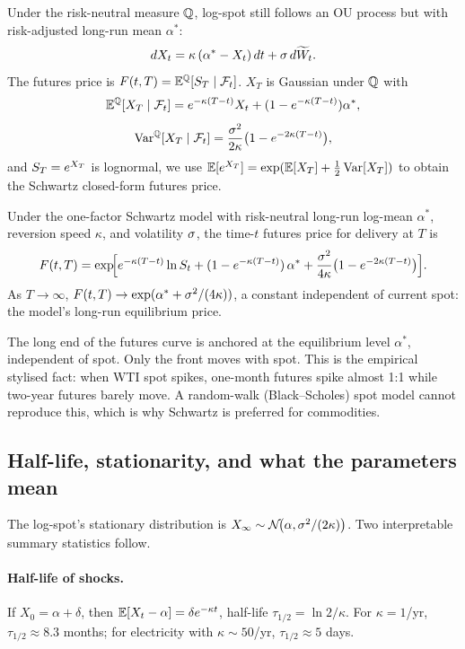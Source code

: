 Under the risk-neutral measure $\mathbb{Q}$, log-spot still follows an OU
process but with risk-adjusted long-run mean $\alpha^*$:
\[
  dX_t = \kappa\,(\alpha^* - X_t)\,dt + \sigma\,d\widetilde W_t.
\]
The futures price is $F(t,T) = \mathbb{E}^{\mathbb{Q}}[S_T \mid \mathcal F_t]$.
$X_T$ is Gaussian under $\mathbb{Q}$ with
\[
  \mathbb{E}^{\mathbb{Q}}[X_T \mid \mathcal F_t] = e^{-\kappa(T-t)} X_t
    + (1 - e^{-\kappa(T-t)})\alpha^*,
\]
\[
  \operatorname{Var}^{\mathbb{Q}}[X_T \mid \mathcal F_t]
    = \frac{\sigma^2}{2\kappa}\bigl(1 - e^{-2\kappa(T-t)}\bigr),
\]
and $S_T = e^{X_T}$ is lognormal, we use
$\mathbb{E}[e^{X_T}] = \exp(\mathbb{E}[X_T] + \tfrac12 \operatorname{Var}[X_T])$ to obtain the
Schwartz closed-form futures price.

\begin{keyfactbox}
Under the one-factor Schwartz model with risk-neutral long-run
log-mean $\alpha^*$, reversion speed $\kappa$, and volatility
$\sigma$, the time-$t$ futures price for delivery at $T$ is
\begin{equation}
  F(t,T) = \exp\!\Bigl[
    e^{-\kappa(T-t)} \ln S_t
    + (1 - e^{-\kappa(T-t)})\,\alpha^*
    + \frac{\sigma^2}{4\kappa}\bigl(1 - e^{-2\kappa(T-t)}\bigr)
  \Bigr].
  \label{eq:schwartz_F}
\end{equation}
As $T \to \infty$, $F(t,T) \to \exp(\alpha^* + \sigma^2/(4\kappa))$,
a constant independent of current spot: the model's long-run
equilibrium price.
\end{keyfactbox}

\begin{intuitionbox}
The long end of the futures curve is anchored at the equilibrium
level $\alpha^*$, independent of spot.  Only the front moves with
spot.  This is the empirical stylised fact: when WTI spot spikes,
one-month futures spike almost 1:1 while two-year futures barely
move.
A random-walk (Black--Scholes) spot model cannot reproduce this,
which is why Schwartz is preferred for commodities.
\end{intuitionbox}

\subsection{Half-life, stationarity, and what the parameters mean}

The log-spot's stationary distribution is
$X_\infty \sim \mathcal{N}\!\bigl(\alpha, \sigma^2/(2\kappa)\bigr)$.
Two interpretable summary statistics follow.

\paragraph{Half-life of shocks.} If $X_0 = \alpha + \delta$, then
$\mathbb{E}[X_t - \alpha] = \delta e^{-\kappa t}$, half-life
$\tau_{1/2} = \ln 2 / \kappa$.  For $\kappa = 1$/yr,
$\tau_{1/2} \approx 8.3$ months; for electricity with
$\kappa \sim 50$/yr, $\tau_{1/2} \approx 5$ days.

